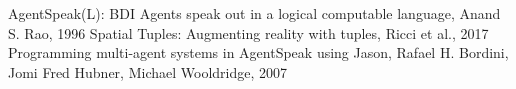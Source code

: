 \documentclass[12pt,a4paper,openright,twoside]{report}
\theoremstyle{plain}
\theoremstyle{definition}
\begin{document}



\makeatletter
\renewcommand\@bibitem[1]
{
  \item\if@filesw \immediate\write\@auxout
  {\string\bibcite{#1}{Bib. \the\value{\@listctr}}}\fi\ignorespaces
}%
\def\@biblabel#1{[Bib. #1]}%
\makeatother

\begin{thebibliography}{90} %
\rhead[\fancyplain{}{\bfseries \leftmark}]{\fancyplain{}{\bfseries \thepage}}


 AgentSpeak(L): BDI Agents speak out in a logical computable language, Anand S. Rao, 1996
 Spatial Tuples: Augmenting reality with tuples, Ricci et al., 2017
 Programming multi-agent systems in AgentSpeak using Jason, Rafael H. Bordini, Jomi Fred Hubner, Michael Wooldridge, 2007

\end{thebibliography}


\makeatletter
\let\@orig@endthebibliography\endthebibliography
\renewcommand\endthebibliography
{
  \xdef\@kept@last@number{\the\c@enumiv}%
  \@orig@endthebibliography
}

\newenvironment{thesitography}[1]
{\def\bibname{Sitografia}%
   \thebibliography{#1}%
}
{\@orig@endthebibliography}

\renewcommand\@bibitem[1]
{
  \item\if@filesw \immediate\write\@auxout
  {\string\bibcite{#1}{Sit. \the\value{\@listctr}}}\fi\ignorespaces
}%
\def\@biblabel#1{[Sit. #1]}%
\makeatother
\end{document}
